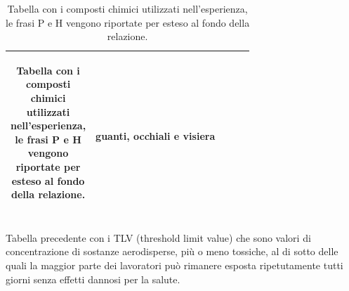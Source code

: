 \begin{table}[!ht]
\begin{tabularx}{\textwidth}{m{}|m{}|m{}|m{}|m{}}
\begin{center}
\begin{tabular}{cc}
            \end{tabular}\end{center}                          & guanti, occhiali e visiera                                       \\
        \bottomrule
    \end{tabularx}
    \caption{Tabella con i composti chimici utilizzati nell'esperienza, le frasi P e H vengono riportate per esteso al fondo della relazione.} %
    \label{tab:tab1} %
    \normalsize
\end{table}

\newpage
Tabella precedente con i TLV (threshold limit value) che sono valori di concentrazione di sostanze aerodisperse, più o meno tossiche, al di sotto delle quali la maggior parte dei lavoratori può rimanere esposta ripetutamente tutti giorni senza effetti dannosi per la salute.

